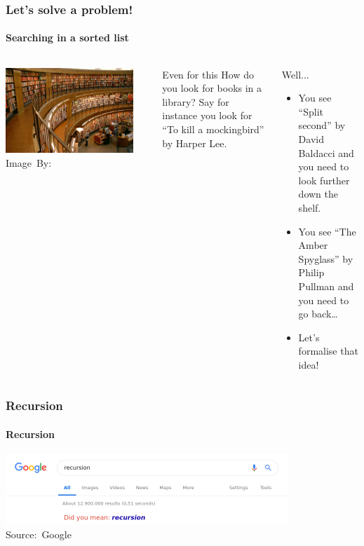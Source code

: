 \begin{frame}
	\frametitle{Let's solve a problem!}
	\framesubtitle{Searching in a sorted list}
	
	\begin{columns}
	\begin{center}
		\includegraphics[width=0.9\textwidth]{figures/library.jpg}\\
		\hspace*{15pt}\hbox{\scriptsize Image By:}
	\end{center}
		\begin{questionblock}{Even for this}
			How do you look for books in a library? Say for instance you look for ``To kill a mockingbird'' by Harper Lee.
		\end{questionblock}
		\pause
		\begin{answerblock}{Well...}
			\begin{itemize}
				\item You see ``Split second'' by David Baldacci and you need to look further down the shelf.
					\pause
				\item You see ``The Amber Spyglass'' by Philip Pullman and you need to go back\dots
					\pause
				\item Let's formalise that idea!
			\end{itemize}
		\end{answerblock}
	\end{columns}
\end{frame}

\begin{frame}
	\frametitle{Recursion}
	\framesubtitle{Recursion}
	\begin{center}
		\includegraphics[width=0.8\textwidth]{figures/google.png}\\
		\hspace*{15pt}\hbox{\scriptsize Source: Google}
	\end{center}	
\end{frame}

